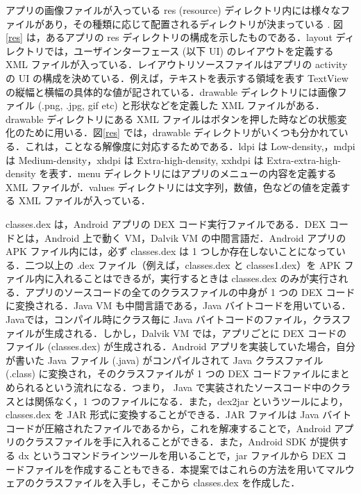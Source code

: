 アプリの画像ファイルが入っている  res (resource) ディレクトリ内には様々なファイルがあり，その種類に応じて配置されるディレクトリが決まっている \cite{resource} . 図\ref{res} は，あるアプリの res ディレクトリの構成を示したものである．layout  ディレクトリでは，ユーザインターフェース (以下 UI) のレイアウトを定義する XML ファイルが入っている．レイアウトリソースファイルはアプリの activity の UI の構成を決めている．例えば，テキストを表示する領域を表す TextView の縦幅と横幅の具体的な値が記されている．drawable ディレクトリには画像ファイル (.png, .jpg, gif etc) と形状などを定義した XML ファイルがある．drawable ディレクトリにある XML ファイルはボタンを押した時などの状態変化のために用いる．図\ref{res} では，drawable ディレクトリがいくつも分かれている．これは，ことなる解像度に対応するためである．ldpi は Low-density,，mdpi は Medium-density，xhdpi は Extra-high-density, xxhdpi は Extra-extra-high-density を表す．menu ディレクトリにはアプリのメニューの内容を定義する XML ファイルが．values  ディレクトリには文字列，数値，色などの値を定義する XML ファイルが入っている．

classes.dex は，Android アプリの DEX コード実行ファイルである．DEX コードとは，Android 上で動く VM，Dalvik VM の中間言語だ．Android アプリの APK ファイル内には，必ず classes.dex は 1 つしか存在しないことになっている．二つ以上の .dex ファイル（例えば，classes.dex と classes1.dex）を APK ファイル内に入れることはできるが，実行するときは classes.dex のみが実行される．アプリのソースコードの全てのクラスファイルの中身が 1 つの DEX コードに変換される．Java VM も中間言語である，Java バイトコードを用いている．Javaでは，コンパイル時にクラス毎に Java バイトコードのファイル，クラスファイルが生成される．しかし，Dalvik VM では，アプリごとに DEX コードのファイル (classes.dex) が生成される．Android アプリを実装していた場合，自分が書いた Java ファイル (.java) がコンパイルされて Java クラスファイル (.class) に変換され，そのクラスファイルが 1 つの DEX コードファイルにまとめられるという流れになる．つまり， Java で実装されたソースコード中のクラスとは関係なく，1 つのファイルになる．また，dex2jar \cite{d2jar} というツールにより，classes.dex を JAR 形式に変換することができる．JAR ファイルは Java バイトコードが圧縮されたファイルであるから，これを解凍することで，Android アプリのクラスファイルを手に入れることができる．また，Android SDK が提供する dx というコマンドラインツールを用いることで，jar ファイルから DEX コードファイルを作成することもできる．本提案ではこれらの方法を用いてマルウェアのクラスファイルを入手し，そこから  classes.dex を作成した．



